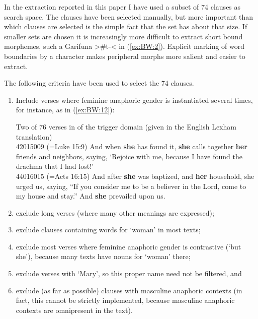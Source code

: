 \documentclass[output=collectionpaper]{langsci/langscibook}
\begin{document}
In the extraction reported in this paper I have used a subset of 74 clauses as search space. The clauses have been selected manually, but more important than which clauses are selected is the simple fact that the set has about that size. If smaller sets are chosen it is increasingly more difficult to extract short bound morphemes, such a Garifuna >\#t-< in (\ref{ex:BW:2}). Explicit marking of word boundaries by a character makes peripheral morphs more salient and easier to extract.

The following criteria have been used to select the 74 clauses.

\begin{enumerate}[label=(\roman*)]
  \item Include verses where feminine anaphoric gender is instantiated several times, for instance, as in (\ref{ex:BW:12}):

  \ea\label{ex:BW:12}
  Two of 76 verses in of the trigger domain (given in the English Lexham translation)\\
42015009 (=Luke 15:9) And when \textbf{she} has found it, \textbf{she} calls together \textbf{her} friends and neighbors, saying, ‘Rejoice with me, because I have found the drachma that I had lost!’\\
44016015 (=Acts 16:15) And after \textbf{she} was baptized, and \textbf{her} household, she urged us, saying, “If you consider me to be a believer in the Lord, come to my house and stay.” And \textbf{she} prevailed upon us.
\z

  \item exclude long verses (where many other meanings are expressed);
  \item exclude clauses containing words for ‘woman’ in most texts;
  \item exclude most verses where feminine anaphoric gender is contrastive (‘but she’), because many texts have nouns for ‘woman’ there;
  \item exclude verses with ‘Mary’, so this proper name need not be filtered, and
  \item exclude (as far as possible) clauses with masculine anaphoric contexts (in fact, this cannot be strictly implemented, because masculine anaphoric contexts are omnipresent in the text).
\end{enumerate}
\end{document}
